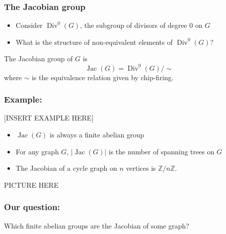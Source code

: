 \documentclass[mathserif, serif, xcolor=dvipsnames]{beamer}
\newcommand{\Z}{\ensuremath{\mathbb{Z}}}
\DeclareMathOperator{\Jac}{Jac}
\DeclareMathOperator{\Div}{Div}
\begin{document}
\begin{frame}
  \frametitle{The Jacobian group}
  \begin{itemize}
  \item Consider $\Div^0(G)$, the subgroup of divisors of degree $0$
    on $G$
    \pause
  \item What is the structure of non-equivalent elements of $\Div^0(G)$?
  \end{itemize}
  \pause
  \begin{definition}
    The Jacobian group of $G$ is
    \begin{equation*}
      \Jac(G) = \Div^0(G)/\sim
    \end{equation*}
    where $\sim$ is the equivalence relation given by chip-firing.
  \end{definition}
\end{frame}

\begin{frame}
  \frametitle{Example:}
  [INSERT EXAMPLE HERE]
\end{frame}

\begin{frame}
  \begin{itemize}
    \item $\Jac(G)$ is always a finite abelian group
      \pause
    \item For any graph $G$, $|\Jac(G)|$ is the number of spanning
      trees on $G$
      \pause
    \item The Jacobian of a cycle graph on $n$ vertices is $\Z/n\Z$. 
  \end{itemize}
  PICTURE HERE
\end{frame}

\begin{frame}
  \frametitle{\textbf{Our question:}} 

  Which finite abelian groups are the Jacobian of some graph?
\end{frame}
\end{document}
